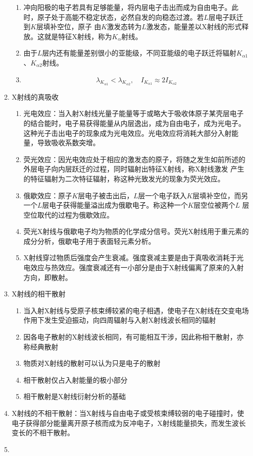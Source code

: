 \documentclass[12pt,a4paper]{article}
\begin{document}
\begin{enumerate}
\begin{enumerate}
            \item 冲向阳极的电子若具有足够能量，将内层电子击出而成为自由电子。此时，原子处于高能不稳定状态，必然自发的向稳态过渡。若$L$层电子跃迁到$K$层填补空位，原子
            由$K$激发态转为$L$激发态，能量差以X射线的形式释放。这就是特征X射线，称为$K_\alpha$射线。
            \item 由于$L$层内还有能量差别很小的亚能级，不同亚能级的电子跃迁将辐射$K_{\alpha1}$、$K_{\alpha2}$射线。
            \item $$\lambda_{K_{\alpha 1}}<\lambda_{K_{\alpha 2}}, \quad I_{K_{\alpha 1}} \approx 2 I_{K_{\alpha 2}}$$
        \end{enumerate}
        \item X射线的真吸收
        \begin{enumerate}
            \item 光电效应：当入射X射线光量子能量等于或略大于吸收体原子某壳层电子的结合能时，电子易获得能量从内层逸出，成为自由电子，成为光电子。
            这种光子击出电子的现象成为光电效应。光电效应将消耗大部分入射能量，导致吸收系数突增。
            \item 荧光效应：因光电效应处于相应的激发态的原子，将随之发生如前所述的外层电子向内层跃迁的过程，同时辐射出特征X射线，称X射线激发
            产生的特征辐射为二次特征辐射，称这种光致发光的现象为荧光效应。
            \item 俄歇效应：原子$K$层电子被击出后，$L$层一个电子跃入$K$层填补空位，而另一个$L$层电子获得能量溢出成为俄歇电子。称这种一个$K$层空位被两个$L$
            层空位取代的过程为俄歇效应。
            \item 荧光X射线与俄歇电子均为物质的化学成分信号。荧光X射线用于重元素的成分分析，俄歇电子用于表面轻元素分析。
            \item X射线穿过物质后强度会产生衰减。强度衰减主要是由于真吸收消耗于光电效应与热效应。强度衰减还有一小部分是由于X射线偏离了原来的入射方向，即散射。
        \end{enumerate}
        \item X射线的相干散射
        \begin{enumerate}
            \item 当入射X射线与受原子核束缚较紧的电子相遇，使电子在X射线在交变电场作用下发生受迫振动，向四周辐射与入射X射线波长相同的辐射
            \item 因各电子散射的X射线波长相同，有可能相互干涉，因此称相干散射，亦称经典散射
            \item 物质对X射线的散射可以认为只是电子的散射
            \item 相干散射仅占入射能量的极小部分
            \item 相干散射是X射线衍射分析的基础
        \end{enumerate}
        \item X射线的不相干散射：当X射线与自由电子或受核束缚较弱的电子碰撞时，使电子获得部分能量离开原子核而成为反冲电子，X射线能量损失，而发生波长变长的不相干散射。
        \item 
    \end{enumerate}
\end{document}

